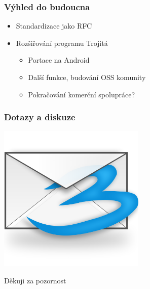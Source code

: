 \documentclass{beamer}
\begin{document}
\begin{frame}[fragile]
  \frametitle{Výhled do budoucna}
  \begin{itemize}
    \item Standardizace jako RFC
    \item Rozšiřování programu Trojitá
      \begin{itemize}
        \item Portace na Android
        \item Další funkce, budování OSS komunity
        \item Pokračování komerční spolupráce?
      \end{itemize}
  \end{itemize}
\end{frame}

\begin{frame}[fragile]
  \frametitle{Dotazy a diskuze}
  \begin{center}
    \includegraphics[width=7cm,clip, trim=0mm 20mm 0mm 30mm]{trojita-from-svg.png}

    \Large{Děkuji za pozornost}
  \end{center}
\end{frame}
\end{document}
